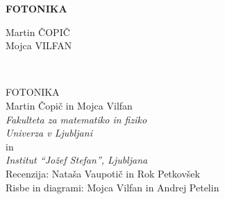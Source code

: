 \documentclass[11pt,fleqn]{book} %
\begin{document}
\let\cleardoublepage\clearpage
\makeatletter
\setlength{\@fptop}{0pt}
\makeatother




\begingroup
\thispagestyle{empty}
\centering
\vspace*{5cm}
\par\normalfont\fontsize{35}{35}\sffamily\selectfont
\textbf{FOTONIKA}
{\LARGE }\par %
\vspace*{1cm}
\vspace*{1cm}
\vspace*{8cm}
{\Large Martin ČOPIČ \\ Mojca VILFAN \\}\par %
\endgroup


\newpage
~\vfill
\thispagestyle{empty}

FOTONIKA \\

Martin Čopič in Mojca Vilfan\\
{\it Fakulteta za matematiko in fiziko\\
Univerza v Ljubljani}\\
in\\
{\it Institut ``Jožef Stefan'', Ljubljana}\\
 
 Recenzija: Nataša Vaupotič in Rok Petkovšek \\%

 Risbe in diagrami: Mojca Vilfan in Andrej Petelin\\ %
 
\end{document}

